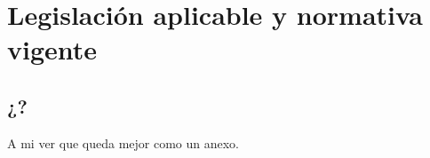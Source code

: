 \chapter{Legislación aplicable y normativa vigente}
\label{cha:regulation}


\section{¿?}

A mi ver que queda mejor como un anexo.
